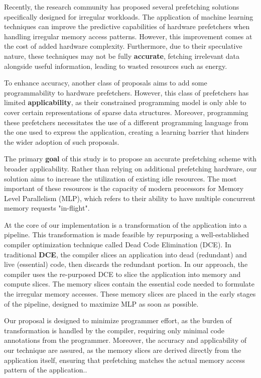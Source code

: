\documentclass{acaces}
\begin{document}
Recently, the research community has proposed several prefetching solutions specifically designed for irregular workloads.
The application of machine learning techniques can improve the predictive capabilities of hardware prefetchers when handling irregular memory access patterns.
However, this improvement comes at the cost of added hardware complexity.
Furthermore, due to their speculative nature, these techniques may not be fully \textbf{accurate}, fetching irrelevant data alongside useful information,
leading to wasted resources such as energy.

To enhance accuracy, another class of proposals aims to add some programmability to hardware prefetchers.
However, this class of prefetchers has limited \textbf{applicability},
as their constrained programming model is only able to cover certain representations of sparse data structures.
Moreover, programming these prefetchers necessitates the use of a different programming language from the one used to express the application,
creating a learning barrier that hinders the wider adoption of such proposals.

The primary \textbf{goal} of this study is to propose an accurate prefetching scheme with broader applicability.
Rather than relying on additional prefetching hardware, our solution aims to increase the utilization of existing idle resources.
The most important of these resources is the capacity of modern processors for Memory Level Parallelism (MLP),
which refers to their ability to have multiple concurrent memory requests "in-flight".

At the core of our implementation is a transformation of the application into a pipeline.
This transformation is made feasible by repurposing a well-established compiler optimization technique called Dead Code Elimination (DCE).
In traditional \textbf{DCE}, the compiler slices an application into dead (redundant) and live (essential) code, then discards the redundant portion.
In our approach, the compiler uses the re-purposed DCE to slice the application into memory and compute slices.
The memory slices contain the essential code needed to formulate the irregular memory accesses.
These memory slices are placed in the early stages of the pipeline, designed to maximize MLP as soon as possible.

Our proposal is designed to minimize programmer effort,
as the burden of transformation is handled by the compiler, requiring only minimal code annotations from the programmer.
Moreover, the accuracy and applicability of our technique are assured, as the memory slices are derived directly from the application itself,
ensuring that prefetching matches the actual memory access pattern of the application..
\end{document}
